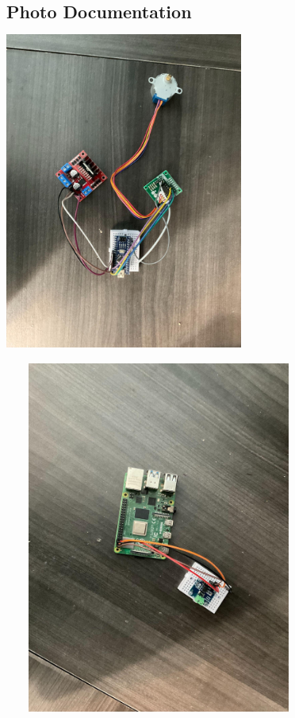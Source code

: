 \subsection[Photo Documentation]{\texorpdfstring{Photo
Documentation\protect\includegraphics[width=3.08333in,height=4.38322in]{media/image46.jpg}\protect\includegraphics[width=4in,height=4.55967in]{media/image49.jpg}}{Photo Documentation}}\label{photo-documentation}

